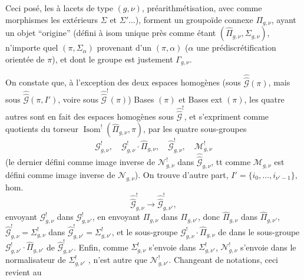 Ceci posé, les 
  à lacets de type $(g,\nu)$,
 préarithmétisation,
avec comme morphismes les   extérieurs
 $\Sigma$ et $\Sigma'\ldots$),
forment un groupoïde connexe $\Pi_{g,\nu}$, ayant un objet ``origine''
(défini à isom unique près comme étant $(\widehat{\Pi}_{g,\nu},\Sigma_{g,\nu})$,
 n'importe quel $(\pi,\Sigma_{\alpha})$ provenant d'un
$(\pi,\alpha)$ ($\alpha$ une prédiscrétification orientée de $\pi$),
et dont le groupe   est justement $\Gamma_{g,\nu}$.


On constate que, à l'exception des deux espaces homogènes
(sous $\widehat{\widehat{\mathcal G}}(\pi)$, mais   sous
$\widehat{\widehat{\mathcal G}}(\pi,I')$, voire sous
$\widehat{\widehat{\mathcal G}}^{!}(\pi)$) Bases $(\pi)$ et Bases ext $(\pi)$,
les quatre autres sont en fait des espaces homogènes sous
$\widehat{\widehat{\mathcal G}}^{!}$, et s'expriment comme quotients du
torseur
$\operatorname{Isom}^{!}(\widehat{\Pi}_{g,\nu},\pi)$, par les quatre sous-groupes
\[
\mathcal G^{!}_{g,\nu},\quad
\mathcal G^{!}_{g,\nu}\cdot\widehat{\Pi}_{g,\nu},\quad
\widehat{\mathcal G}^{!}_{g,\nu},\quad
\mathcal M^{!}_{g,\nu}
\]
(le dernier défini comme image inverse de $\mathcal N^{!}_{g,\nu}$ dans
$\widehat{\widehat{\mathcal G}}_{g,\nu}$, tt comme $\mathcal M_{g,\nu}$ est défini
comme image inverse de $\mathcal N_{g,\nu}$).
On trouve d'autre part,  $I'=\{i_0,\ldots,i_{\nu'-1}\}$,
 hom.
\[
\widehat{\widehat{\mathcal G}}^{!}_{g,\nu}\longrightarrow
\widehat{\widehat{\mathcal G}}^{!}_{g,\nu'},
\]
envoyant $\mathcal G^{!}_{g,\nu}$ dans $\mathcal G^{!}_{g,\nu'}$,
en envoyant $\Pi_{g,\nu}$ dans $\Pi_{g,\nu'}$, donc $\widehat{\Pi}_{g,\nu}$
dans $\widehat{\Pi}_{g,\nu'}$,
$\widehat{\mathcal G}^{!}_{g,\nu}=\Sigma^{!}_{g,\nu}$ dans
$\widehat{\mathcal G}^{!}_{g,\nu'}=\Sigma^{!}_{g,\nu'}$, et le sous-groupe
$\mathcal G^{!}_{g,\nu}\cdot\widehat{\Pi}_{g,\nu}$ de
dans le sous-groupe $\mathcal G^{!}_{g,\nu'}\cdot\widehat{\Pi}_{g,\nu'}$ de
$\widehat{\mathcal G}^{!}_{g,\nu'}$.
Enfin, comme $\Sigma^{!}_{g,\nu}$ s'envoie dans $\Sigma^{!}_{g,\nu'}$,
 $\mathcal N^{!}_{g,\nu}$ s'envoie dans le normalisateur
de $\Sigma^{!}_{g,\nu'}$ ,
 n'est autre que $\mathcal N^{!}_{g,\nu'}$.
Changeant de notations, ceci revient au

